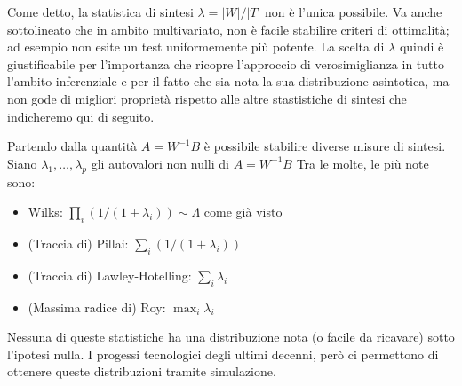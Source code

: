\documentclass[10pt]{article}
\begin{document}
Come detto, la statistica di sintesi $\lambda=|W|/|T|$ non è l'unica possibile. Va anche sottolineato che in ambito multivariato, non è facile stabilire criteri di ottimalità; ad esempio non esite un test uniformemente più potente. La scelta di $\lambda$ quindi è giustificabile per l'importanza che ricopre l'approccio di verosimiglianza in tutto l'ambito inferenziale e per il fatto che sia nota la sua distribuzione asintotica, ma non gode di migliori proprietà rispetto alle altre stastistiche di sintesi che indicheremo qui di seguito.

Partendo dalla quantità $A=W^{-1}B$ è possibile stabilire diverse misure di sintesi. 
Siano $\lambda_1, \ldots,\lambda_p$ gli autovalori non nulli di $A=W^{-1}B$
Tra le molte, le più note sono:
\begin{itemize}
\item Wilks: $\prod_i (1/(1+\lambda_i))\sim \Lambda$ come già visto
\item (Traccia di) Pillai: $\sum_i (1/(1+\lambda_i))$
\item (Traccia di) Lawley-Hotelling: $\sum_i \lambda_i$
\item (Massima radice di) Roy: $\max_i \lambda_i$
\end{itemize}
Nessuna di queste statistiche ha una distribuzione nota (o facile da ricavare) sotto l'ipotesi nulla. I progessi tecnologici degli ultimi decenni, però ci permettono di ottenere queste distribuzioni tramite simulazione. 
\end{document}
